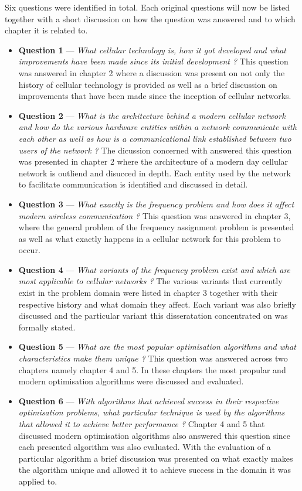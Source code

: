 Six questions were identified in total. Each original questions will now be listed together with a short discussion on how the question was answered and to which chapter it is related to.
\begin{itemize}
\item \textbf{Question 1} --- \emph{What cellular technology is, how it got developed and what improvements have been made since its initial development ?} This question was answered in chapter 2 where a discussion was present on not only the history of cellular technology is provided as well as a brief discussion on improvements that have been made since the inception of cellular networks.
\item \textbf{Question 2} --- \emph{What is the architecture behind a modern cellular network and how do the various hardware entities within a network communicate with each other as well as how is a communicational link established between two users of the network ?}  The dicussion concerned with answered this question was presented in chapter 2 where the architecture of a modern day cellular network is outliend and disucced in depth. Each entity used by the network to facilitate communication is identified and discussed in detail.
\item \textbf{Question 3} --- \emph{What exactly is the frequency problem and how does it affect modern wireless communication ? } This question was answered in chapter 3, where the general problem of the frequency assignment problem is presented as well as what exactly happens in a cellular network for this problem to occur.
\item \textbf{Question 4} --- \emph{What variants of the frequency problem exist and which are most applicable to cellular networks ?} The various variants that currently exist in the problem domain were listed in chapter 3 together with their respective history and what domain they affect. Each variant was also briefly discussed and the particular variant this disseratation concentrated on was formally stated. 
\item \textbf{Question 5} --- \emph{What are the most popular optimisation algorithms and what characteristics make them unique ?} This question was answered across two chapters namely chapter 4 and 5. In these chapters the most propular and modern optimisation algorithms were discussed and evaluated.
\item \textbf{Question 6} --- \emph{With algorithms that achieved success in their respective optimisation problems, what particular technique is used by the algorithms that allowed it to achieve better performance ?} Chapter 4 and 5 that discussed modern optimisation algorithms also answered this question since each presented algorithm was also evaluated. With the evaluation of a particular algorithm a brief discussion was presented on what exactly makes the algorithm unique and allowed it to achieve success in the domain it was applied to.
\end{itemize}


